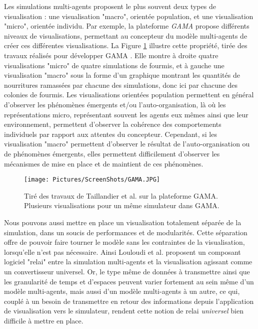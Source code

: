 		Les simulations multi-agents proposent le plus souvent deux types de visualisation : une visualisation "macro", orientée population, et une visualisation "micro", orientée individu. Par exemple, la plateforme \textit{GAMA} \cite{taillandier_building_2019} propose différents niveaux de visualisations, permettant au concepteur du modèle multi-agents de créer ces différentes visualisations. La Figure \ref{GAMA} illustre cette propriété, tirée des travaux réalisés pour développer GAMA \cite{taillandier_building_2019}. Elle montre à droite quatre visualisations "micro" de quatre simulations de fourmis, et à gauche une visualisation "macro" sous la forme d'un graphique montrant les quantités de nourritures ramassées par chacune des simulations, donc ici par chacune des colonies de fourmis.
		Les visualisations orientées population permettent en général d'observer les phénomènes émergents et/ou l'auto-organisation, là où les représentations micro, représentant souvent les agents eux mêmes ainsi que leur environnement, permettent d'observer la cohérence des comportements individuels par rapport aux attentes du concepteur. Cependant, si les visualisation "macro" permettent d'observer le résultat de l'auto-organisation ou de phénomènes émergents, elles permettent difficilement d'observer les mécanismes de mise en place et de maintient de ces phénomènes.
		
		\begin{figure}
			\centering
			\texttt{[image: Pictures/ScreenShots/GAMA.JPG]}
			\caption{Tiré des travaux de Taillandier et al. \cite{taillandier_building_2019} sur la plateforme GAMA. Plusieurs visualisations pour un même simulateur dans GAMA.}
			\label{GAMA}
		\end{figure}
		
		Nous pouvons aussi mettre en place un visualisation totalement séparée de la simulation, dans un soucis de performances et de modularités. Cette séparation offre de pouvoir faire tourner le modèle sans les contraintes de la visualisation, lorsqu'elle n'est pas nécessaire. Ainsi Louloudi et al. \cite{louloudi_new_2012} proposent un composant logiciel "relai" entre la simulation multi-agents et la visualisation agissant comme un convertisseur universel.
		Or, le type même de données à transmettre ainsi que les granularité de temps et d'espaces peuvent varier fortement au sein même d'un modèle multi-agents, mais aussi d'un modèle multi-agents à un autre, ce qui, couplé à un besoin de transmettre en retour des informations depuis l'application de visualisation vers le simulateur, rendent cette notion de relai \textit{universel} bien difficile à mettre en place.
		
